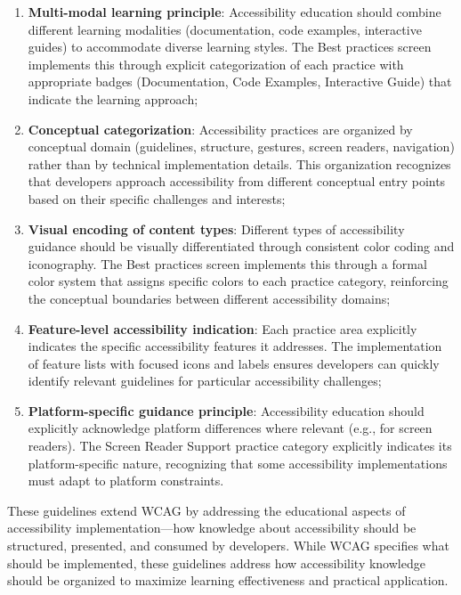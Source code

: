 \begin{enumerate}
    \item \textbf{Multi-modal learning principle}: Accessibility education should combine different learning modalities (documentation, code examples, interactive guides) to accommodate diverse learning styles. The Best practices screen implements this through explicit categorization of each practice with appropriate badges (Documentation, Code Examples, Interactive Guide) that indicate the learning approach;
    
    \item \textbf{Conceptual categorization}: Accessibility practices are organized by conceptual domain (guidelines, structure, gestures, screen readers, navigation) rather than by technical implementation details. This organization recognizes that developers approach accessibility from different conceptual entry points based on their specific challenges and interests;
    
    \item \textbf{Visual encoding of content types}: Different types of accessibility guidance should be visually differentiated through consistent color coding and iconography. The Best practices screen implements this through a formal color system that assigns specific colors to each practice category, reinforcing the conceptual boundaries between different accessibility domains;
    
    \item \textbf{Feature-level accessibility indication}: Each practice area explicitly indicates the specific accessibility features it addresses. The implementation of feature lists with focused icons and labels ensures developers can quickly identify relevant guidelines for particular accessibility challenges;
    
    \item \textbf{Platform-specific guidance principle}: Accessibility education should explicitly acknowledge platform differences where relevant (e.g., for screen readers). The Screen Reader Support practice category explicitly indicates its platform-specific nature, recognizing that some accessibility implementations must adapt to platform constraints.
\end{enumerate}

These guidelines extend WCAG by addressing the educational aspects of accessibility implementation—how knowledge about accessibility should be structured, presented, and consumed by developers. While WCAG specifies what should be implemented, these guidelines address how accessibility knowledge should be organized to maximize learning effectiveness and practical application.

